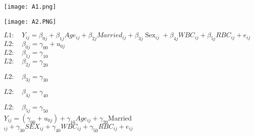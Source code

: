 \documentclass[unknownkeysallowed]{beamer}
\begin{document}
\begin{frame}
\texttt{[image: A1.png]}
\end{frame}

\begin{frame}
\texttt{[image: A2.PNG]}
\end{frame}

\begin{frame}
$L 1:\quad Y_{i j}=\beta_{0 j}+\beta_{1 j} A g e_{i j}+\beta_{2 j} Married_{i j}+\beta_{3 j} \operatorname{Sex}_{i j}+\beta_{4 j} W B C_{i j}+\beta_{5 j} R B C_{i j}+e_{i j}$\\
\vspace{0.4cm}
$L 2: \quad \beta_{0 j}=\gamma_{00}+u_{0 j}$\\

\vspace{0.4cm}
$L 2: \quad \beta_{1 j}=\gamma_{10}$\\

\vspace{0.4cm}
$L 2: \quad \beta_{2 j}=\gamma_{20}$\\
\vspace{0.4cm}

$L 2: \quad \beta_{3 j}=\gamma_{30}$\\
\vspace{0.4cm}

$L 2: \quad \beta_{4 j}=\gamma_{40}$\\
\vspace{0.4cm}

$L 2: \quad \beta_{5 j}=\gamma_{50}$\\
\vspace{0.4cm}
$Y_{i j}=\left(\gamma_{00}+u_{0 j}\right)+\gamma_{10} A g e_{i j}+\gamma_{20}$Married$_{i j}+\gamma_{30} S E X_{i j}+\gamma_{40} W B C_{i j}+\gamma_{50} R B C_{i j}+e_{i j}$
\end{frame}
\end{document}
